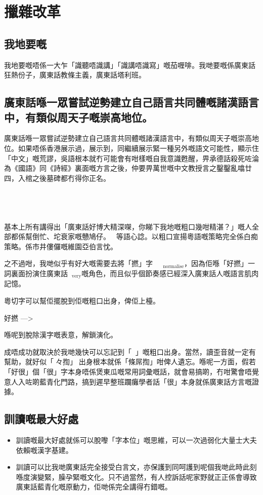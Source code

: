 \chapter{擸雜改革}

\section{我地要嘅}
我地要嘅唔係一大乍「識聽唔識講」「識講唔識寫」嘅茄喱啡。我哋要嘅係廣東話狂熱份子，廣東話教條主義，廣東話塔利班。
\section{廣東話喺一眾嘗試逆勢建立自己語言共同體嘅諸漢語言中，有類似周天子嘅崇高地位。}

廣東話喺一眾嘗試逆勢建立自己語言共同體嘅諸漢語言中，有類似周天子嘅崇高地位。如果唔係香港展示過，展示到，同繼續展示緊一種另外嘅語文可能性，顯示住「中文」嘅荒謬，吳語根本就冇可能會有咁樣嘅自我意識甦醒，畀承德話殺死咗淪為《國語》同《詩經》裏面嘅方言之後，仲要畀萬世嘅中文教授言之鑿鑿亂噏廿四，入棺之後墓碑都冇得你正名。



\section{}
基本上所有講得出「廣東話好博大精深㗎，你睇下我地嘅粗口幾咁精湛？」嘅人全部都係幫倒忙、坨衰家嘅戇鳩仔。等語心諗。以粗口宣揚粵語嘅策略完全係白痴策略。係市井僂儸嘅維園亞伯言忱。

之不過咁，我哋似乎有好大嘅需要去將「撚」字 $_{\text{normalise}}$，因為佢喺「好撚」一詞裏面扮演住廣東話$_{\text{very}}$嘅角色，而且似乎個節奏感已經深入廣東話人嘅語言肌肉記憶。

粵切字可以幫佢擺脫到佢嘅粗口出身，俾佢上檯。

好撚 —> 󱭱󰹱

喺呢到脫除漢字嘅表意，解鎖演化。

成唔成功就取決於我哋幾快可以忘記到「」嘅粗口出身。當然，讀歪音就一定有幫助，就好似「々揈」󱝚出身根本就係「條屌揈」咁俾人遺忘。喺呢一方面，假若「好很」個「很」字本身唔係煲東瓜嘅常用詞彙嘅話，就會易搞啲，冇咁驚會唔覺意人入咗啲藍青化門路，搞到遲早整班躝癱學者話「很」本身就係廣東話方言嘅證據。



\section{訓讀嘅最大好處}
\begin{itemize}
  \item 訓讀嘅最大好處就係可以脫嚟「字本位」嘅思維，可以一次過弱化大量士大夫依賴嘅漢字基建。
  \item 訓讀可以比我哋廣東話完全接受白言文，亦保護到同呵護到呢個我哋此時此刻喺度演變緊，臊孕緊嘅文化。只不過當然，有人控訴話呢家野就正正係會導致廣東話藍青化嘅原動力，佢哋係完全講得冇錯嘅。
\end{itemize}



